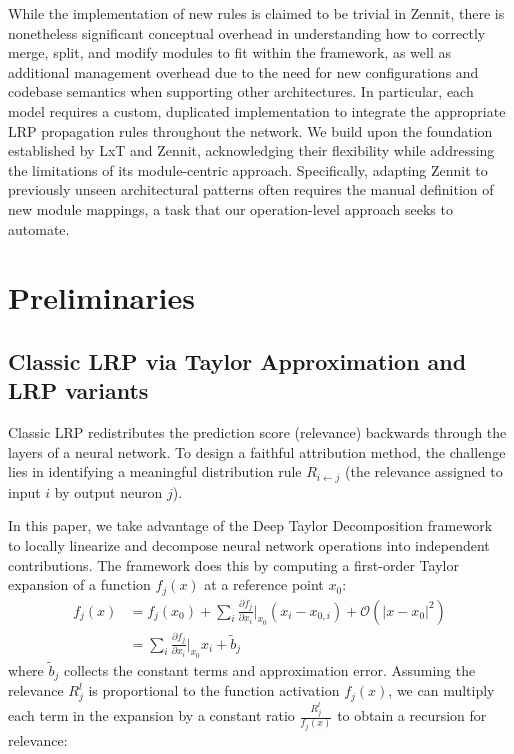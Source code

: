 \documentclass{article}
\begin{document}
While the implementation of new rules is claimed to be trivial in Zennit, there is nonetheless significant conceptual overhead in understanding 
how to correctly merge, split, and modify modules to fit within the framework, as well as additional management overhead
due to the need for new configurations and codebase semantics when supporting other architectures. In particular, each model
 requires a custom, duplicated implementation to integrate the appropriate LRP propagation rules throughout the network. 
 We build upon the foundation established by LxT and Zennit, acknowledging their flexibility while addressing the limitations of its 
 module-centric approach. Specifically, adapting Zennit to previously unseen architectural patterns often requires the manual definition
 of new module mappings, a task that our operation-level approach seeks to automate.



\section{Preliminaries}
\subsection{Classic LRP via Taylor Approximation and LRP variants}
\label{methods:taylor}

Classic LRP redistributes the prediction score (relevance) backwards through the layers of a neural network. To design a faithful attribution method, the challenge lies in identifying a meaningful distribution rule $R_{i\leftarrow j}$ (the relevance assigned to input $i$ by output neuron $j$).

In this paper, we take advantage of the Deep Taylor Decomposition framework~\cite{montavon2017explaining, achtibat2024attnlrp} to locally linearize and decompose neural network operations into independent contributions. The framework does this by computing a first-order Taylor expansion of a function $f_j(x)$ at a reference point $x_0$:
\begin{align}
      f_j(x) &= f_j(x_0) + \sum_i \frac{\partial f_j}{\partial x_i}\Big|_{x_0} (x_i - x_{0,i})  + \mathcal{O}(|x -x_0|^2) \nonumber \\
      &= \sum_i \frac{\partial f_j}{\partial x_i}\Big|_{x_0} x_i + \tilde{b}_j
     \label{eq:taylor}
\end{align} 
where $\tilde{b}_j$ collects the constant terms and approximation error.
Assuming the relevance $R_j^l$ is proportional to the function activation $f_j(x)$, we can multiply each term in the expansion by a constant ratio $\frac{R_j^l}{f_j(x)}$ to obtain a recursion for relevance:
\end{document}
